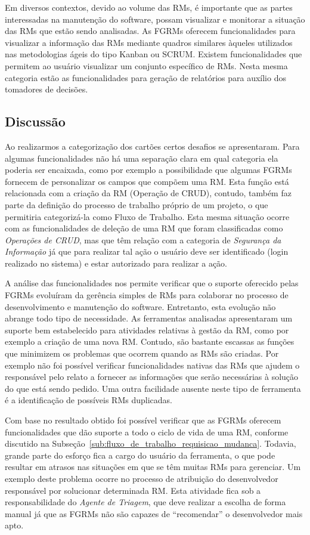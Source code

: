 Em diversos contextos, devido ao volume das RMs, é importante que as partes
interessadas na manutenção do software, possam visualizar e monitorar a situação
das RMs que estão sendo analisadas. As FGRMs oferecem funcionalidades para
visualizar a informação das RMs mediante quadros similares àqueles utilizados
nas metodologias ágeis do tipo Kanban ou SCRUM\@. Existem funcionalidades que
permitem ao usuário visualizar um conjunto específico de RMs. Nesta mesma
categoria estão as funcionalidades para geração de relatórios para auxílio dos
tomadores de decisões.

\subsection{Discussão}
\label{sec:discussao}

Ao realizarmos a categorização dos cartões certos desafios se apresentaram. Para
algumas funcionalidades não há uma separação clara em qual categoria ela poderia
ser encaixada, como por exemplo a possibilidade que algumas FGRMs fornecem de
personalizar os campos que compõem uma RM\@. Esta função está relacionada com a
criação da RM (Operação de CRUD), contudo, também faz parte da definição do
processo de trabalho próprio de um projeto, o que permitiria categorizá-la como
Fluxo de Trabalho. Esta mesma situação ocorre com as funcionalidades de deleção
de uma RM que foram classificadas como \textit{Operações de CRUD}, mas que têm
relação com a categoria de \textit{Segurança da Informação} já que para realizar
tal ação o usuário deve ser identificado (login realizado no sistema) e estar
autorizado para realizar a ação.

A análise das funcionalidades nos permite verificar que o suporte oferecido
pelas FGRMs evoluíram da gerência simples de RMs para colaborar no processo de
desenvolvimento e manutenção do software. Entretanto, esta evolução não abrange
todo tipo de necessidade. As ferramentas analisadas apresentaram um suporte bem
estabelecido para atividades relativas à gestão da RM, como por exemplo a
criação de uma nova RM\@. Contudo, são bastante escassas as funções que
minimizem os problemas que ocorrem quando as RMs são criadas. Por exemplo não
foi possível verificar funcionalidades nativas das RMs que ajudem o responsável
pelo relato a fornecer as informações que serão necessárias à solução do que
está sendo pedido. Uma outra facilidade ausente neste tipo de ferramenta é a
identificação de possíveis RMs duplicadas.

Com base no resultado obtido foi possível verificar que as FGRMs oferecem
funcionalidades que dão suporte a todo o ciclo de vida de uma RM, conforme
discutido na Subseção~\ref{sub:fluxo_de_trabalho_requisicao_mudanca}. Todavia,
grande parte do esforço fica a cargo do usuário da ferramenta, o que pode
resultar em atrasos nas situações em que se têm muitas RMs para gerenciar. Um
exemplo deste problema ocorre no processo de atribuição do desenvolvedor
responsável por solucionar determinada RM\@. Esta atividade fica sob a
responsabilidade do \textit{Agente de Triagem}, que deve realizar a escolha de
forma manual já que as FGRMs não são capazes de ``recomendar'' o desenvolvedor
mais apto.

